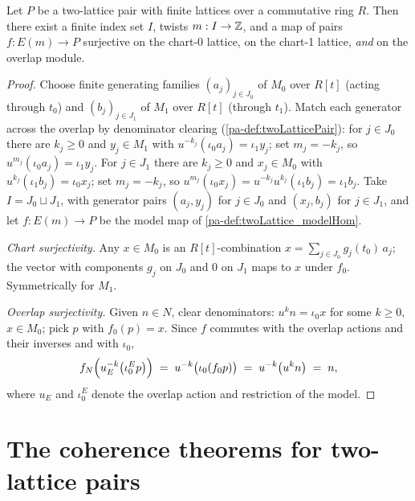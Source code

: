 \begin{theorem}
  \label{pa-thm:exists_hom_model_surjective}
  \leanok

  Let \(P\) be a two-lattice pair with finite lattices over a commutative ring \(R\).
  Then there exist a finite index set \(I\), twists \(m : I \to \mathbb{Z}\), and a map of
  pairs \(f : E(m) \to P\) surjective on the chart-0 lattice, on the chart-1 lattice,
  \emph{and} on the overlap module.
\end{theorem}
\begin{proof}
  \leanok
  Choose finite generating families \((a_j)_{j \in J_0}\) of \(M_0\) over \(R[t]\)
  (acting through \(t_0\)) and \((b_j)_{j \in J_1}\) of \(M_1\) over \(R[t]\) (through
  \(t_1\)). Match each generator across the overlap by denominator clearing
  (\ref{pa-def:twoLatticePair}): for \(j \in J_0\) there are \(k_j \ge 0\) and
  \(y_j \in M_1\) with \(u^{-k_j}(\iota_0 a_j) = \iota_1 y_j\); set \(m_j = -k_j\), so
  \(u^{m_j}(\iota_0 a_j) = \iota_1 y_j\). For \(j \in J_1\) there are \(k_j \ge 0\) and
  \(x_j \in M_0\) with \(u^{k_j}(\iota_1 b_j) = \iota_0 x_j\); set \(m_j = -k_j\), so
  \(u^{m_j}(\iota_0 x_j) = u^{-k_j} u^{k_j} (\iota_1 b_j) = \iota_1 b_j\). Take
  \(I = J_0 \sqcup J_1\), with generator pairs \((a_j, y_j)\) for \(j \in J_0\) and
  \((x_j, b_j)\) for \(j \in J_1\), and let \(f : E(m) \to P\) be the model map of
  \ref{pa-def:twoLattice_modelHom}.

  \emph{Chart surjectivity.} Any \(x \in M_0\) is an \(R[t]\)-combination
  \(x = \sum_{j \in J_0} g_j(t_0)\, a_j\); the vector with components \(g_j\) on
  \(J_0\) and \(0\) on \(J_1\) maps to \(x\) under \(f_0\). Symmetrically for \(M_1\).

  \emph{Overlap surjectivity.} Given \(n \in N\), clear denominators:
  \(u^k n = \iota_0 x\) for some \(k \ge 0\), \(x \in M_0\); pick \(p\) with
  \(f_0(p) = x\). Since \(f\) commutes with the overlap actions and their inverses and
  with \(\iota_0\),
  \[
    f_N\Bigl(u_E^{-k}\bigl(\iota_0^{E} p\bigr)\Bigr)
    \;=\; u^{-k}\bigl(\iota_0(f_0 p)\bigr)
    \;=\; u^{-k}\bigl(u^{k} n\bigr) \;=\; n ,
  \]
  where \(u_E\) and \(\iota_0^E\) denote the overlap action and restriction of the
  model.
\end{proof}

\section{The coherence theorems for two-lattice pairs}
\label{pa-sec:two_lattice_coherence}

